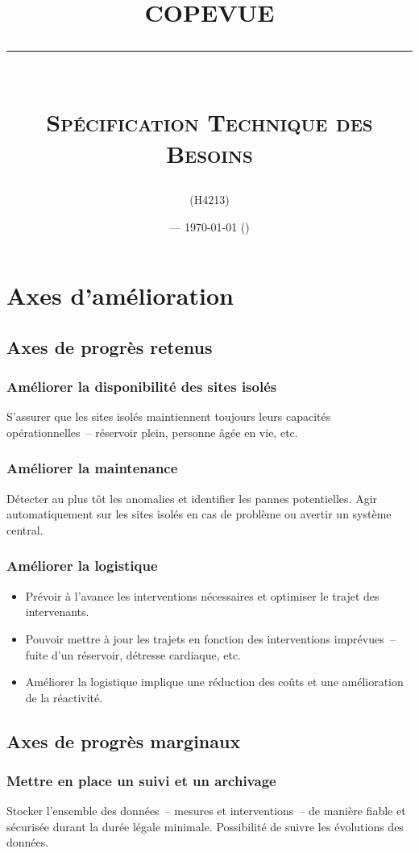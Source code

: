 \documentclass[a4paper, 11pt]{article}
\title{\textbf{COPEVUE}\\
\rule{\textwidth}{1pt}{}\\
\Huge{\textsc{Spécification Technique des Besoins}}}
\author{\docauthor{} (H4213)}
\date{\docname{} --- \today{} (\docstatus{})}
\begin{document}
\maketitle

\tableofcontents

\pagebreak


\section{Axes d'amélioration}
\subsection{Axes de progrès retenus}
\subsubsection{Améliorer la disponibilité des sites isolés}
S'assurer que les sites isolés maintiennent toujours leurs capacités opérationnelles~-- réservoir plein, personne âgée en vie, etc.
\subsubsection{Améliorer la maintenance}
Détecter au plus tôt les anomalies et identifier les pannes potentielles. Agir automatiquement sur les sites isolés en cas de problème ou avertir un système central.
\subsubsection{Améliorer la logistique}
\begin{itemize}
\item Prévoir à l'avance les interventions nécessaires et optimiser le trajet des intervenants.
\item Pouvoir mettre à jour les trajets en fonction des interventions imprévues~-- fuite d'un réservoir, détresse cardiaque, etc.
\item Améliorer la logistique implique une réduction des coûts et une amélioration de la réactivité.
\end{itemize}

\subsection{Axes de progrès marginaux}
\subsubsection{Mettre en place un suivi et un archivage}
Stocker l'ensemble des données~-- mesures et interventions~-- de manière fiable et sécurisée durant la durée légale minimale. Possibilité de suivre les évolutions des données.
\end{document}
